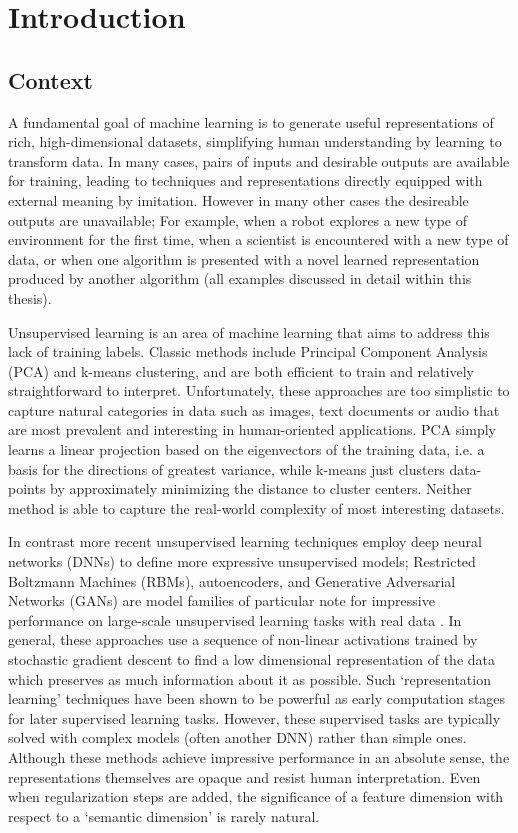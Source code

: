 \chapter{Introduction} \label{ch:intro}

\section{Context}
A fundamental goal of machine learning is to generate useful representations of rich, high-dimensional datasets, simplifying human understanding by learning to transform data.
In many cases, pairs of inputs and desirable outputs are available for training, leading to techniques and representations directly equipped with external meaning by imitation. However in many other cases the desireable outputs are unavailable; For example, when a robot explores a new type of environment for the first time, when a scientist is encountered with a new type of data, or when one algorithm is presented with a novel learned representation produced by another algorithm (all examples discussed in detail within this thesis).

Unsupervised learning is an area of machine learning that aims to address this lack of training labels. Classic methods include Principal Component Analysis (PCA) and k-means clustering, and are both efficient to train and relatively straightforward to interpret. Unfortunately, these approaches are too simplistic to capture natural categories in data such as images, text documents or audio that are most prevalent and interesting in human-oriented applications. PCA simply learns a linear projection based on the eigenvectors of the training data, i.e. a basis for the directions of greatest variance, while k-means just clusters data-points by approximately minimizing the distance to cluster centers. Neither method is able to capture the real-world complexity of most interesting datasets.

In contrast more recent unsupervised learning techniques employ deep neural networks (DNNs) to define more expressive unsupervised models; Restricted Boltzmann Machines (RBMs), autoencoders, and Generative Adversarial Networks (GANs) are model families of particular note for impressive performance on large-scale unsupervised learning tasks with real data \citep{Bengio2013,Goodfellow2014}. In general, these approaches use a sequence of non-linear activations trained by stochastic gradient descent to find a low dimensional representation of the data which preserves as much information about it as possible. Such `representation learning' techniques have been shown to be powerful as early computation stages for later supervised learning tasks. However, these supervised tasks are typically solved with complex models (often another DNN) rather than simple ones. Although these methods achieve impressive performance in an absolute sense, the representations themselves are opaque and resist human interpretation. Even when regularization steps are added, the significance of a feature dimension with respect to a `semantic dimension' is rarely natural.


